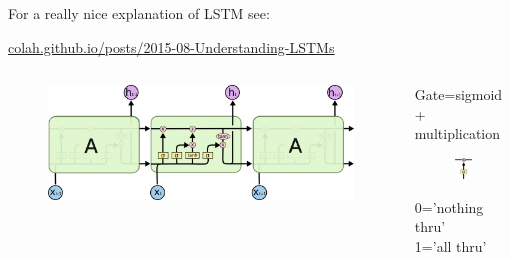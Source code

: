 \documentclass[xcolor=dvipsnames]{beamer}
\begin{document}
\begin{frame}
 For a really nice explanation of LSTM see:  

 \url{colah.github.io/posts/2015-08-Understanding-LSTMs}
\begin{columns}
  \begin{column}{.75\textwidth}
 \begin{figure}
   \centering
   \includegraphics[width=\linewidth]{fig/LSTM3-chain.png} 
 \end{figure}
  \end{column}

  \begin{column}{.25\textwidth}
    \begin{block}{Gate=sigmoid + multiplication}
      \begin{figure}
        \centering
        \includegraphics[width=.5\linewidth]{fig/LSTM3-gate.png} 
        \label{fig:gate}
      \end{figure}
\small{0='nothing thru' \\ 1='all thru'}
    \end{block}
  \end{column}
\end{columns}
\end{frame}
\end{document}
